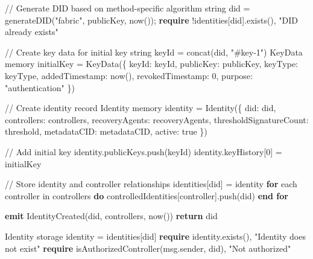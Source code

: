 \documentclass[lettersize,journal]{IEEEtran}
\begin{document}
\begin{itemize}
\begin{algorithm}[H]
\begin{algorithmic}[1]
    \State // Generate DID based on method-specific algorithm
    \State string did = generateDID("fabric", publicKey, now());
    \State \textbf{require} !identities[did].exists(), "DID already exists"
    
    \State // Create key data for initial key
    \State string keyId = concat(did, "#key-1")
    \State KeyData memory initialKey = KeyData(\{
        \hspace{\algorithmicindent}keyId: keyId,
        \hspace{\algorithmicindent}publicKey: publicKey,
        \hspace{\algorithmicindent}keyType: keyType,
        \hspace{\algorithmicindent}addedTimestamp: now(),
        \hspace{\algorithmicindent}revokedTimestamp: 0,
        \hspace{\algorithmicindent}purpose: "authentication"
    \})
    
    \State // Create identity record
    \State Identity memory identity = Identity(\{
        \hspace{\algorithmicindent}did: did,
        \hspace{\algorithmicindent}controllers: controllers,
        \hspace{\algorithmicindent}recoveryAgents: recoveryAgents,
        \hspace{\algorithmicindent}thresholdSignatureCount: threshold,
        \hspace{\algorithmicindent}metadataCID: metadataCID,
        \hspace{\algorithmicindent}active: true
    \})
    
    \State // Add initial key
    \State identity.publicKeys.push(keyId)
    \State identity.keyHistory[0] = initialKey
    
    \State // Store identity and controller relationships
    \State identities[did] = identity
    \State \textbf{for} each controller in controllers \textbf{do}
        \State \hspace{\algorithmicindent} controlledIdentities[controller].push(did)
    \State \textbf{end for}
    
    \State \textbf{emit} IdentityCreated(did, controllers, now())
    \State \textbf{return} did
\EndFunction
\Statex 

    \State Identity storage identity = identities[did]
    \State \textbf{require} identity.exists(), "Identity does not exist"
    \State \textbf{require} isAuthorizedController(msg.sender, did), "Not authorized"
    

\end{algorithmic}
\end{algorithm}
\end{itemize}
\end{document}
